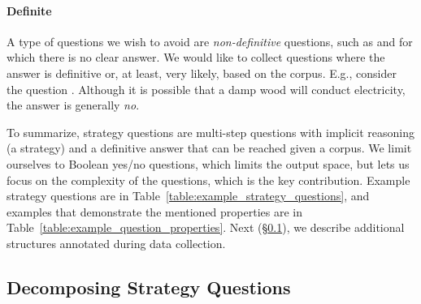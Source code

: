 {
\paragraph{Definite} 
A type of questions we wish to avoid are \emph{non-definitive} questions, such as  and  for which there is no clear answer.
We would like to collect questions where the answer is definitive or, at least, very likely, based on the corpus.
E.g., consider the question . Although it is possible that a damp wood will conduct electricity, the answer is generally \emph{no}.

To summarize, strategy questions are multi-step questions with implicit reasoning (a strategy) and a definitive answer 
that can be reached given a corpus.
We limit ourselves to Boolean
yes/no questions,
which limits the output space, but lets us focus on the complexity of the questions, which is the key contribution. 
Example strategy questions are in Table~\ref{table:example_strategy_questions}, and examples that demonstrate the mentioned properties are in Table~\ref{table:example_question_properties}.
Next (\S\ref{sec:strategy_questions_supervision}), we describe additional structures annotated during data collection.

\subsection{Decomposing Strategy Questions}
\label{sec:strategy_questions_supervision}

}
